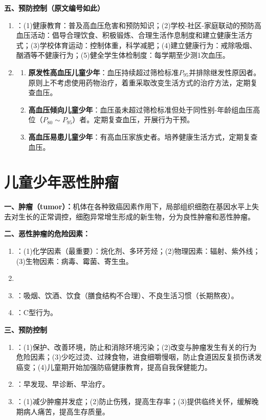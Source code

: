 \begin{keybox}
\textbf{五、预防控制（原文编号如此）}
\begin{enumerate}[leftmargin=*]
    \item {}：(1)健康教育：普及高血压危害和预防知识；(2)学校-社区-家庭联动的预防高血压活动：倡导合理饮食、积极锻炼、合理生活作息制度和建立健康生活方式；(3)学校体育运动：控制体重，科学减肥；(4)建立健康行为：戒除吸烟、酗酒等不健康行为；(5)健全学生体检制度：每学期至少测1次血压。
    \item {}
    \begin{enumerate}
        \item \textbf{原发性高血压儿童少年}：血压持续超过筛检标准$P_{95}$并排除继发性原因者。原则上不考虑使用药物治疗，着重采取改变生活方式的治疗方法，定期复查血压。
        \item \textbf{高血压倾向儿童少年}：血压虽未超过筛检标准但处于同性别-年龄组血压高位（$P_{80}\sim P_{95}$）者。定期复查血压，开展行为干预。
        \item \textbf{高血压易患儿童少年}：有高血压家族史者。培养健康生活方式，定期复查血压。
    \end{enumerate}
\end{enumerate}
\end{keybox}

\section{儿童少年恶性肿瘤}

\begin{keybox}
\textbf{一、肿瘤（tumor）：}机体在各种致癌因素作用下，局部组织细胞在基因水平上失去对生长的正常调控，细胞异常增生形成的新生物，分为良性肿瘤和恶性肿瘤。

\textbf{二、恶性肿瘤的危险因素：}
\begin{enumerate}[leftmargin=*]
    \item {}：(1)化学因素（最重要）：烷化剂、多环芳烃；(2)物理因素：辐射、紫外线；(3)生物因素：病毒、霉菌、寄生虫。
    \item {}
    \item {}：吸烟、饮酒、饮食（膳食结构不合理）、不良生活习惯（长期熬夜）。
    \item {}：C型行为。
\end{enumerate}

\textbf{三、预防控制}
\begin{enumerate}[leftmargin=*]
    \item {}：(1)保护、改善环境，防止和消除环境污染；(2)改变与肿瘤发生有关的行为危险因素；(3)少吃过烫、过辣食物，进食细嚼慢咽，防止食道因反复损伤诱发癌变；(4)儿童期开始加强防癌健康教育，提高自我保健能力。
    \item {}：早发现、早诊断、早治疗。
    \item {}：(1)减少肿瘤并发症；(2)防止伤残，提高生存率；(3)提供临终关怀，缓解晚期病人痛苦，提高生存质量。
\end{enumerate}
\end{keybox}

\newpage
